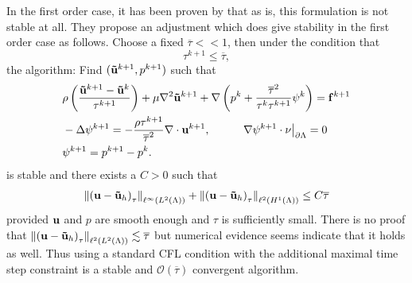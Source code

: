 \documentclass[letterpaper]{erdc}
\begin{document}
In the first order case, it has been proven by \cite{bonito2015modified} that
as is, this formulation is not stable at all.  They propose an adjustment which
does give stability in the first order case as follows.  Choose a fixed
$\overline{\tau}<<1$, then under the condition that
\begin{equation}
  \tau^{k+1} \leq \overline{\tau},
\end{equation}
the algorithm: Find $(\mathbf{\tilde{u}}^{k+1},p^{k+1})$ such that
\begin{align}
  &\rho\left( \frac{\mathbf{\tilde{u}}^{k+1} - \mathbf{\tilde{u}}^{k}}{\tau^{k+1}} \right) + \mu\nabla^2 \mathbf{\tilde{u}}^{k+1} + \nabla\left( p^{k} + \frac{\overline{\tau}^2}{\tau^{k}\tau^{k+1}}\psi^{k}\right) = \mathbf{f}^{k+1}\label{eq:newnewadaptivevelocitybdf1}\\
  &-\Delta \psi^{k+1} = -\frac{\rho\tau^{k+1}}{\overline{\tau}^2}\nabla\cdot\textbf{u}^{k+1}, \hspace{1cm} \left.\nabla\psi^{k+1}\cdot\nu\right|_{\partial\Lambda} = 0 \label{eq:newnewadaptivepressurecorrectionbdf1}\\
  & \psi^{k+1} = p^{k+1} - p^{k}.
\end{align}
is stable and there exists a $C>0$ such that
\begin{equation}
\left\| \left( \textbf{u} - \mathbf{\tilde{u}}_h \right)_{\tau} \right\|_{\ell^{\infty}(L^2(\Lambda))} + \left\| \left(\textbf{u} - \mathbf{\tilde{u}}_h\right)_{\tau} \right\|_{\ell^{2}(H^1(\Lambda))} \leq C \overline{\tau}
\end{equation}
provided $\textbf{u}$ and $p$ are smooth enough and $\tau$ is sufficiently small.
There is no proof that
$\left\| \left( \textbf{u} - \mathbf{\tilde{u}}_h \right)_{\tau} \right\|_{\ell^{2}(L^2(\Lambda))}
\lesssim \overline{\tau}$
but numerical evidence seems indicate that it holds as well.  Thus using a
standard CFL condition with the additional maximal time step constraint is a
stable and $\mathcal{O}(\overline{\tau})$ convergent algorithm.


%
%
\end{document}
